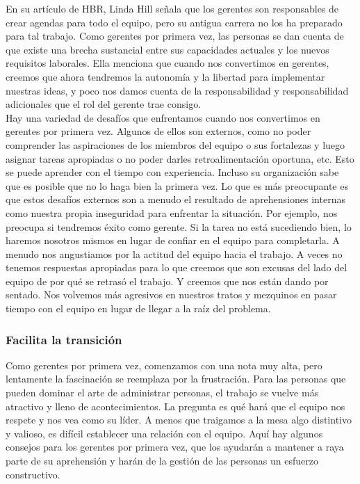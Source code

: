 \documentclass[10pt]{book}
\begin{document}
En su artículo de HBR, Linda Hill señala que los gerentes son responsables de crear agendas para todo el equipo, pero su antigua carrera no los ha preparado para tal trabajo. Como gerentes por primera vez, las personas se dan cuenta de que existe una brecha sustancial entre sus capacidades actuales y los nuevos requisitos laborales. Ella menciona que cuando nos convertimos en gerentes, creemos que ahora tendremos la autonomía y la libertad para implementar nuestras ideas, y poco nos damos cuenta de la responsabilidad y responsabilidad adicionales que el rol del gerente trae consigo.\\
Hay una variedad de desafíos que enfrentamos cuando nos convertimos en gerentes por primera vez. Algunos de ellos son externos, como no poder comprender las aspiraciones de los miembros del equipo o sus fortalezas y luego asignar tareas apropiadas o no poder darles retroalimentación oportuna, etc. Esto se puede aprender con el tiempo con experiencia. Incluso su organización sabe que es posible que no lo haga bien la primera vez. Lo que es más preocupante es que estos desafíos externos son a menudo el resultado de aprehensiones internas como nuestra propia inseguridad para enfrentar la situación. Por ejemplo, nos preocupa si tendremos éxito como gerente. Si la tarea no está sucediendo bien, lo haremos nosotros mismos en lugar de confiar en el equipo para completarla. A menudo nos angustiamos por la actitud del equipo hacia el trabajo. A veces no tenemos respuestas apropiadas para lo que creemos que son excusas del lado del equipo de por qué se retrasó el trabajo. Y creemos que nos están dando por sentado. Nos volvemos más agresivos en nuestros tratos y mezquinos en pasar tiempo con el equipo en lugar de llegar a la raíz del problema.
\subsubsection{Facilita la transición}
Como gerentes por primera vez, comenzamos con una nota muy alta, pero lentamente la fascinación se reemplaza por la frustración. Para las personas que pueden dominar el arte de administrar personas, el trabajo se vuelve más atractivo y lleno de acontecimientos. La pregunta es qué hará que el equipo nos respete y nos vea como su líder. A menos que traigamos a la mesa algo distintivo y valioso, es difícil establecer una relación con el equipo. Aquí hay algunos consejos para los gerentes por primera vez, que los ayudarán a mantener a raya parte de su aprehensión y harán de la gestión de las personas un esfuerzo constructivo.\\
\end{document}
